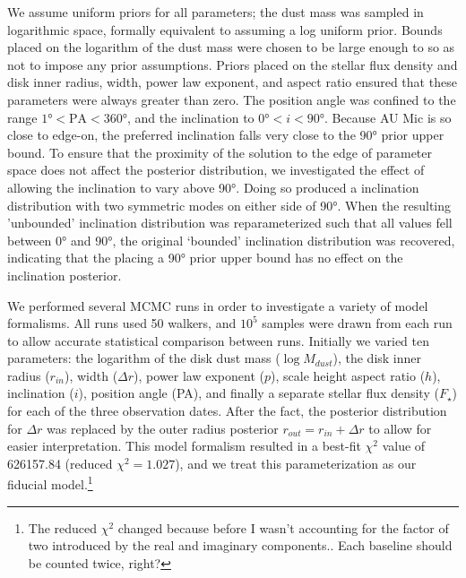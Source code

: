 \documentclass[modern]{aastex62}
\begin{document}
We assume uniform priors for all parameters; the dust mass was sampled in logarithmic space, formally equivalent to assuming a log uniform prior.
Bounds placed on the logarithm of the dust mass were chosen to be large enough to so as not to impose any prior assumptions.
Priors placed on the stellar flux density and disk inner radius, width, power law exponent, and aspect ratio ensured that these parameters were always greater than zero.
The position angle was confined to the range $\ang{1} < \text{PA} < \ang{360}$, and the inclination to $\ang{0} < i < \ang{90}$.
Because AU Mic is so close to edge-on, the preferred inclination falls very close to the \ang{90} prior upper bound. 
To ensure that the proximity of the solution to the edge of parameter space does not affect the posterior distribution, we investigated the effect of allowing the inclination to vary above \ang{90}. 
Doing so produced a inclination distribution with two symmetric modes on either side of \ang{90}. 
When the resulting ’unbounded’ inclination distribution was reparameterized such that all values fell between \ang{0} and \ang{90}, the original ‘bounded’ inclination distribution was recovered, indicating that the placing a \ang{90} prior upper bound has no effect on the inclination posterior.

We performed several MCMC runs in order to investigate a variety of model formalisms. 
All runs used 50 walkers, and $10^5$ samples were drawn from each run to allow accurate statistical comparison between runs.
Initially we varied ten parameters: the logarithm of the disk dust mass ($\log M_{dust}$), the disk inner radius ($r_{in}$), width ($\Delta r$), power law exponent ($p$), scale height aspect ratio ($h$), inclination ($i$), position angle (PA), and finally a separate stellar flux density ($F_\star$) for each of the three observation dates. 
After the fact, the posterior distribution for $\Delta r$ was replaced by the outer radius posterior $r_{out} = r_{in} + \Delta r$ to allow for easier interpretation.
This model formalism resulted in a best-fit $\chi^2$ value of 626157.84 (reduced $\chi^2=1.027$), and we treat this parameterization as our fiducial model.\footnote{The reduced $\chi^2$ changed because before I wasn't accounting for the factor of two introduced by the real and imaginary components.. Each baseline should be counted twice, right?}
\end{document}
